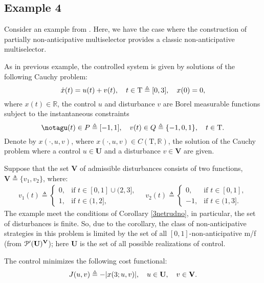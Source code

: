 \documentclass[sn-mathphys,Numbered,pdflatex]{sn-jnl}%
\theoremstyle{thmstyleone}%
\theoremstyle{thmstyletwo}%
\theoremstyle{thmstylethree}%
\newcommand{\beqnt}{\begin{equation}\notag}
\newcommand{\eeq}{\end{equation}}
\newcommand{\mydef}{\mathrel{\triangleq}}%
\newcommand{\icPp}[1]{\EuScript{P^\prime}({#1})}%
\newcommand{\RA}{\ensuremath{\mathbb R}}%
\newcommand{\naT}{\ensuremath{\mathrm{T}}}%
\newcommand{\UB}{{\mathbf U}}%
\newcommand{\VB}{{\mathbf V}}%
\begin{document}
\subsection{Example 4}
\label{ex4}

Consider an example from \cite[\S5]{GomSer-UDSU2021}.
Here, we have the case where the construction of partially non-anticipative multiselector provides a classic non-anticipative multiselector.

As in previous example, the controlled system is given by solutions of the following Cauchy problem:
\beqnt
         \dot x(t)=u(t) + v(t), \quad t \in\naT \mydef [0, 3], \quad x(0) = 0,
\eeq
where $x(t) \in \mathbb{R}$, the control $u$ and disturbance $v$ are Borel measurable functions subject to the instantaneous constraints
\beqnt%
         u(t) \in P \mydef [- 1, 1], \quad v(t) \in Q \mydef \{- 1, 0, 1\}, \quad t \in\naT.
\eeq
Denote by $x(\cdot,u,v)$, where $x(\cdot,u,v)\in C(\naT,\RA)$, the solution of the Cauchy problem where a control $u\in\UB$ and a disturbance $v\in\VB$ are given.

Suppose that the set $\VB$ of admissible disturbances consists of two functions, $\VB\mydef\{v_1, v_2\}$, where:
     \begin{gather*}
         v_1(t)
         \mydef \begin{cases}
             0, & \mbox{if } t \in [0, 1] \cup (2, 3], \\
             1, & \mbox{if } t \in (1, 2],
         \end{cases}
         \quad v_2(t)
         \mydef \begin{cases}
             0, & \mbox{if } t \in [0, 1], \\
             - 1, & \mbox{if } t \in (1, 3].
         \end{cases}
     \end{gather*}
The example meet the conditions of Corollary \ref{3netrudno}, in particular, the set of disturbances is finite.
So, due to the corollary, the class of non-anticipative strategies in this problem is limited by the set of all $[0,1]$-non-anticipative m/f  (from $\icPp{\UB}^\VB$);
here $\UB$ is the set of all possible realizations of control.

The control minimizes the following cost functional:
\beqnt
         J(u,v)\mydef - |x(3; u, v)|,\quad u \in \UB, \quad v\in \VB.
\eeq
\end{document}
